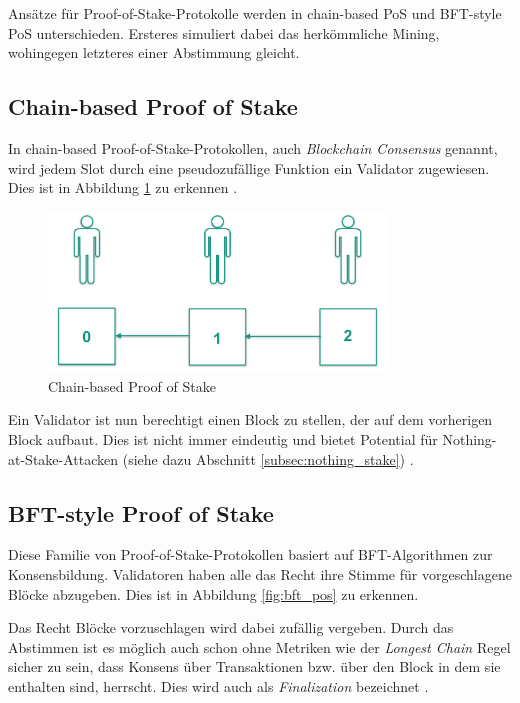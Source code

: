 Ansätze für Proof-of-Stake-Protokolle werden in chain-based PoS und BFT-style PoS unterschieden. Ersteres simuliert dabei das herkömmliche Mining, wohingegen letzteres einer Abstimmung gleicht.

\subsection{Chain-based Proof of Stake}
\label{subsec:cb_pos}

In chain-based Proof-of-Stake-Protokollen, auch \textit{Blockchain Consensus} genannt, wird jedem Slot durch eine pseudozufällige Funktion ein Validator zugewiesen.
Dies ist in Abbildung \ref{fig:chainbased} zu erkennen \cite[S. 1]{casper_cbc}.

\begin{figure}[htb] 
	\centerline{\includegraphics*[width=0.8\textwidth]{img/chainbased_pos}}
\caption{Chain-based Proof of Stake} 
\label{fig:chainbased}
\end{figure}

Ein Validator ist nun berechtigt einen Block zu stellen, der auf dem vorherigen Block aufbaut. Dies ist nicht immer eindeutig und bietet Potential für Nothing-at-Stake-Attacken (siehe dazu Abschnitt \ref{subsec:nothing_stake}) \cite[S. 1]{casper_ffg}.

\subsection{BFT-style Proof of Stake}

Diese Familie von Proof-of-Stake-Protokollen basiert auf BFT-Algorithmen zur Konsensbildung.
Validatoren haben alle das Recht ihre Stimme für vorgeschlagene Blöcke abzugeben. Dies ist in Abbildung \ref{fig:bft_pos} zu erkennen.

Das Recht Blöcke vorzuschlagen wird dabei zufällig vergeben. Durch das Abstimmen ist es möglich auch schon ohne Metriken wie der \textit{Longest Chain} Regel sicher zu sein, dass Konsens über Transaktionen bzw. über den Block in dem sie enthalten sind, herrscht\footnotemark \cite[S. 3]{bitcoin}. Dies wird auch als \textit{Finalization} bezeichnet \cite[S. 1f.]{casper_cbc}.

